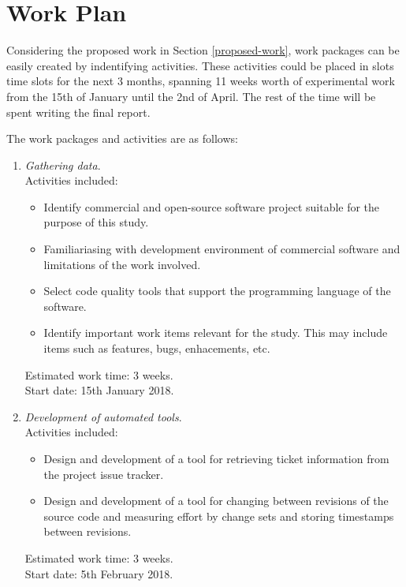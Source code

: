 \documentclass{mprop}
\begin{document}
\section{Work Plan}
\label{work-plan}

Considering the proposed work in Section \ref{proposed-work}, work packages can
be easily created by indentifying activities. These activities could be placed
in slots time slots for the next 3 months, spanning 11 weeks worth of
experimental work from the 15th of January until the 2nd of April. The rest of
the time will be spent writing the final report.

The work packages and activities are as follows:

\begin{enumerate}
	\item \textit{Gathering data}.\\
	Activities included:
	\begin{itemize}
		\item Identify commercial and open-source software project suitable for
		the purpose of this study.
		\item Familiariasing with development environment of commercial software
		and limitations of the work involved.
		\item Select code quality tools that support the programming language of
		the software.
		\item Identify important work items relevant for the study. This may
		include items such as features, bugs, enhacements, etc.
	\end{itemize}

	Estimated work time: 3 weeks.\\
	Start date: 15th January 2018.
	
	\item \textit{Development of automated tools}.\\
	Activities included:
	\begin{itemize}
		\item Design and development of a tool for retrieving ticket information
		from the project issue tracker.
		\item Design and development of a tool for changing between revisions of
		the source code and measuring effort by change sets and storing
		timestamps between revisions.
	\end{itemize}

	Estimated work time: 3 weeks.\\
	Start date: 5th February 2018.


\end{enumerate}
\end{document}
